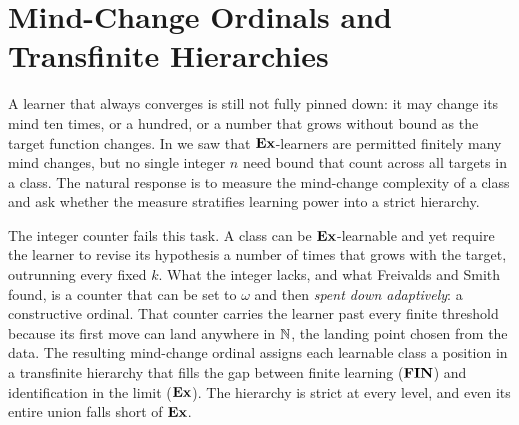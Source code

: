 %

\chapter{Mind-Change Ordinals and Transfinite Hierarchies}
\label{ch:ordinals}

A learner that always converges is still not fully pinned down: it may change
its mind ten times, or a hundred, or a number that grows without bound as the
target function changes.  In  we saw that $\mathbf{Ex}$-learners are
permitted finitely many mind changes, but no single integer $n$ need bound
that count across all targets in a class.  The natural response is to measure
the mind-change complexity of a class and ask whether the measure stratifies
learning power into a strict hierarchy.

The integer counter fails this task.  A class can be $\mathbf{Ex}$-learnable and yet
require the learner to revise its hypothesis a number of times that grows with
the target, outrunning every fixed $k$.  What the integer lacks, and what
Freivalds and Smith~\cite{FreivaldsSmith1993} found, is a counter that can be
set to $\omega$ and then \emph{spent down adaptively}: a constructive ordinal.
That counter carries the learner past every finite threshold because its first
move can land anywhere in $\mathbb{N}$, the landing point chosen from the data.  The
resulting mind-change ordinal assigns each learnable class a position in a
transfinite hierarchy that fills the gap between finite learning ($\mathbf{FIN}$) and
identification in the limit ($\mathbf{Ex}$).  The hierarchy is strict at every level,
and even its entire union falls short of $\mathbf{Ex}$.

\medskip

